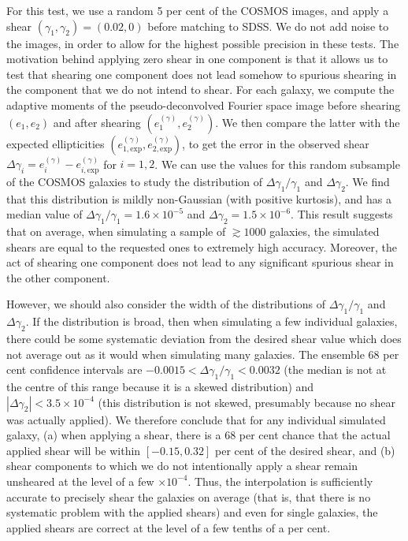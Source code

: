 \documentclass[twocolumn,useAMS,usenatbib]{mn2e}
\begin{document}
For this test, we use a random 5 per cent of the COSMOS images, and
apply a shear $(\gamma_1,\gamma_2)=(0.02,0)$ before matching to SDSS.
We do not add noise to the images, in order to allow for the highest
possible precision in these tests.  The motivation behind
applying zero shear in one component is that it allows us to test that
shearing one component does not lead somehow to spurious shearing in
the component that we do not intend to shear.  For each galaxy, we compute
the adaptive moments of the pseudo-deconvolved Fourier space image
before shearing $(e_1,e_2)$ and after shearing
$(e_1^{(\gamma)},e_2^{(\gamma)})$.  We then compare the latter with
the expected ellipticities $(e_{1,\mathrm{exp}}^{(\gamma)},e_{2,\mathrm{exp}}^{(\gamma)})$, to
get the error in the observed shear $\Delta\gamma_i =
e_i^{(\gamma)}-e_{i,\mathrm{exp}}^{(\gamma)}$ for $i=1,2$.  We can use
the values for this random subsample of the COSMOS galaxies to study
the distribution of $\Delta\gamma_1/\gamma_1$ and $\Delta\gamma_2$.
We find that this distribution is mildly non-Gaussian (with positive
kurtosis), and has a median value of $\Delta\gamma_1/\gamma_1=1.6\times
10^{-5}$ and $\Delta\gamma_2=1.5\times 10^{-6}$.  This result suggests
that on average, when simulating a sample of
$\gtrsim 1000$ galaxies, the simulated shears are equal to the
requested ones to extremely high accuracy.   Moreover, the act of
shearing one component does not lead to any significant spurious shear
in the other component.

However, we should also consider the width of the distributions of $\Delta\gamma_1/\gamma_1$ and $\Delta\gamma_2$.  If
the distribution is broad, then when
simulating a few individual galaxies, there could be some systematic
deviation from the desired shear value which does not average out as
it would when simulating many galaxies.  The ensemble 68 per cent confidence
intervals are $-0.0015 < \Delta\gamma_1/\gamma_1 < 0.0032$ (the median
is not at the centre of this range because it is a skewed
distribution) and $|\Delta\gamma_2| < 3.5\times 10^{-4}$ (this
distribution is not skewed, presumably because no shear was actually applied). We therefore
conclude that for any individual simulated galaxy, (a) when applying a
shear, there is a 68 per cent chance that the actual applied shear
will be within $[-0.15, 0.32]$ per cent of the desired shear,
and (b) shear components to which we do not intentionally apply a
shear remain unsheared at the level of a few $\times 10^{-4}$.  Thus,
the interpolation is sufficiently accurate 
to precisely shear the galaxies on average (that
is, that there is no systematic problem with the applied shears) and
 even for single galaxies, the applied shears are correct at the
level of a few tenths of a per cent.
\end{document}
